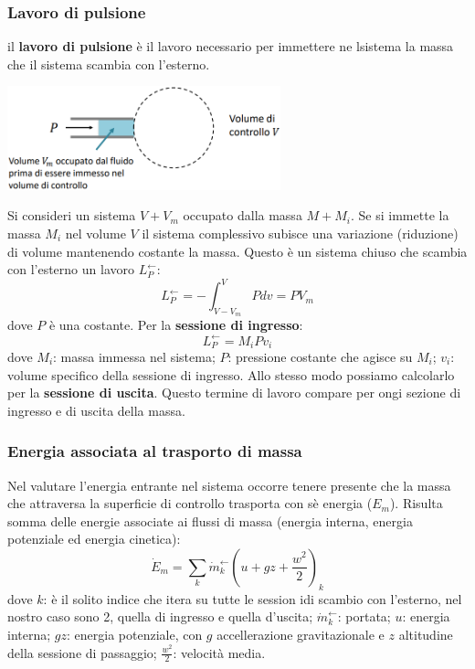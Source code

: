 \subsubsection{Lavoro di pulsione}
il \textbf{lavoro di pulsione} è il lavoro necessario per immettere ne lsistema la massa che il sistema scambia con l'esterno.
\begin{center}
    \includegraphics[height=3cm]{../L06/img2.PNG}
\end{center}
Si consideri un sistema $V + V_m$ occupato dalla massa $M + M_i$. Se si immette la massa $M_i$ nel volume $V$ il sistema complessivo subisce una variazione (riduzione) di volume mantenendo costante la massa.\newline
\newline
Questo è un sistema chiuso che scambia con l'esterno un lavoro $L_P^\leftarrow $:
\[
    L_P^\leftarrow  = - \int_{V-V_m}^{V}Pdv = P V_m
\]
dove $P$ è una costante. \newline
\newline
Per la \textbf{sessione di ingresso}:
\[
    L_P^\leftarrow  = M_i P v_i
\]
dove \newline
$M_i$: massa immessa nel sistema;\newline
$P$: pressione costante che agisce su $M_i$; \newline
$v_i$: volume specifico della sessione di ingresso.\newline
Allo stesso modo possiamo calcolarlo per la \textbf{sessione di uscita}.\newline
\newline
Questo termine di lavoro compare per ongi sezione di ingresso e di uscita della massa.
\subsubsection{Energia associata al trasporto di massa}
Nel valutare l'energia entrante nel sistema occorre tenere presente che la massa che attraversa la superficie di controllo trasporta con sè energia ($E_m$).\newline
\newline
Risulta somma delle energie associate ai flussi di massa (energia interna, energia potenziale ed energia cinetica):
\[
    \dot{E}_m = \sum_{k} \dot{m}_k^\leftarrow \left(u + gz + \frac{w^2}{2}\right)_k
\]
dove \newline
$k$: è il solito indice che itera su tutte le session idi scambio con l'esterno, nel nostro caso sono 2, quella di ingresso e quella d'uscita;\newline
$\dot{m}_k^\leftarrow $: portata; \newline
$u$: energia interna;\newline
$gz$: energia potenziale, con $g$ accellerazione gravitazionale e $z$ altitudine della sessione di passaggio;\newline
$\frac{w^2}{2}$: velocità media.
